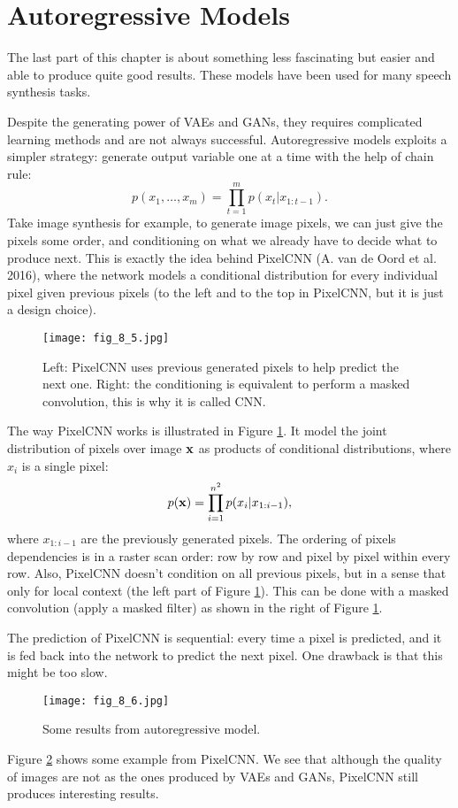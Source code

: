 \documentclass[../book-template.tex]{subfiles}
\begin{document}
\section{Autoregressive Models}
The last part of this chapter is about something less fascinating but easier and able to produce quite good results. These models have been used for many speech synthesis tasks.
\par Despite the generating power of VAEs and GANs, they requires complicated learning methods and are not always successful. Autoregressive models exploits a simpler strategy: generate output variable one at a time with the help of chain rule:
\begin{equation*}
	p(x_1,\dots,x_m)=\prod_{t=1}^{m}p(x_t|x_{1:t-1}).
\end{equation*}
Take image synthesis for example, to generate image pixels, we can just give the pixels some order, and conditioning on what we already have to decide what to produce next. This is exactly the idea behind PixelCNN (A. van de Oord et al. 2016), where the network models a conditional distribution for every individual pixel given previous pixels (to the left and to the top in PixelCNN, but it is just a design choice).
\begin{figure}[h] 
	\centering 
	\texttt{[image: fig\_8\_5.jpg]} 
	\caption{Left: PixelCNN uses previous generated pixels to help predict the next one. Right: the conditioning is equivalent to perform a masked convolution, this is why it is called CNN.}\label{fig_8_5}
\end{figure}
The way PixelCNN works is illustrated in Figure \ref{fig_8_5}. It model the joint distribution of pixels over image ${\bf x}$ as products of conditional distributions, where $x_i$ is a single pixel:
\begin{equation*}
	p({\bf x})=\prod_{i=1}^{n^2}p(x_i|x_{1:i-1}),
\end{equation*}
where $x_{1:i-1}$ are the previously generated pixels. The ordering of pixels dependencies is in a raster scan order: row by row and pixel by pixel within every row. Also, PixelCNN doesn't condition on all previous pixels, but in a sense that only for local context (the left part of Figure \ref{fig_8_5}). This can be done with a masked convolution (apply a masked filter) as shown in the right of Figure \ref{fig_8_5}.
\par The prediction of PixelCNN is sequential: every time a pixel is predicted, and it is fed back into the network to predict the next pixel. One drawback is that this might be too slow. 
\begin{figure}[h] 
	\centering 
	\texttt{[image: fig\_8\_6.jpg]} 
	\caption{Some results from autoregressive model.}\label{fig_8_6}
\end{figure}
\par Figure \ref{fig_8_6} shows some example from PixelCNN. We see that although the quality of images are not as the ones produced by VAEs and GANs, PixelCNN still produces interesting results.
\end{document}
